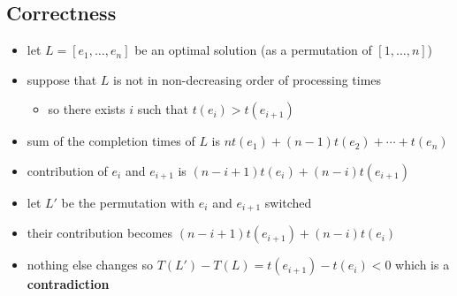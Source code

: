 \documentclass[11pt]{article}
\begin{document}
\subsection{Correctness}
\label{sec:orge0ad702}
\begin{itemize}
\item let \(L = [e_{1}, \dots, e_{n}]\) be an optimal solution (as a permutation of
\([1, \dots, n]\))
\item suppose that \(L\) is not in non-decreasing order of processing times
\begin{itemize}
\item so there exists \(i\) such that \(t(e_{i}) > t(e_{i+1})\)
\end{itemize}
\item sum of the completion times of \(L\) is \(nt(e_{1}) + (n-1) t(e_{2}) + \cdots + t(e_{n})\)
\item contribution of \(e_{i}\) and \(e_{i+1}\) is
\((n-i+1)t(e_{i}) + (n-i)t(e_{i+1})\)
\item let \(L'\) be the permutation with \(e_{i}\) and \(e_{i+1}\) switched
\item their contribution becomes \((n-i+1)t(e_{i+1}) + (n-i)t(e_{i})\)
\item nothing else changes so \(T(L') - T(L) = t(e_{i+1}) - t(e_{i}) < 0\)
which is a \textbf{contradiction}
\end{itemize}
\end{document}

